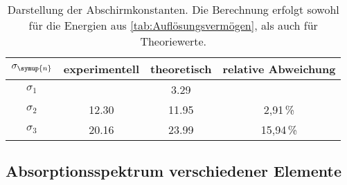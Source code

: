 \begin{table}
  \centering
  \caption{Darstellung der Abschirmkonstanten. Die Berechnung erfolgt sowohl für die Energien aus \autoref{tab:Auflösungsvermögen}, %
  als auch für Theoriewerte.}
  \label{tab:Abschirmkonstanten}
  \begin{tabular}{c S[table-format=2.2] S[table-format=2.2] S[table-format=2.2]}
    \toprule
    {$\sigma_{\symup{n}}$} & {experimentell} & {theoretisch} & {relative Abweichung}\\
    \midrule
    $\sigma_1$  & {}    & 3.29  & {}        \\
    $\sigma_2$  & 12.30 & 11.95 & 2,91\,\%  \\
    $\sigma_3$  & 20.16 & 23.99 & 15,94\,\% \\
    \bottomrule
  \end{tabular}
\end{table}

\subsection{Absorptionsspektrum verschiedener Elemente}